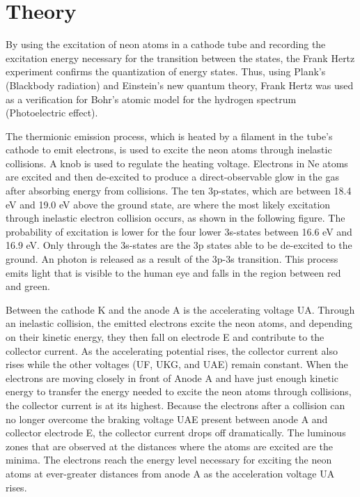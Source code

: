 \section{Theory}

	By using the excitation of neon atoms in a cathode tube and recording the excitation energy necessary for the transition between the states, the Frank Hertz experiment confirms the quantization of energy states. Thus, using Plank's (Blackbody radiation) and Einstein's new quantum theory, Frank Hertz was used as a verification for Bohr's atomic model for the hydrogen spectrum (Photoelectric effect).

	The thermionic emission process, which is heated by a filament in the tube's cathode to emit electrons, is used to excite the neon atoms through inelastic collisions. A knob is used to regulate the heating voltage. Electrons in Ne atoms are excited and then de-excited to produce a direct-observable glow in the gas after absorbing energy from collisions. The ten 3p-states, which are between 18.4 eV and 19.0 eV above the ground state, are where the most likely excitation through inelastic electron collision occurs, as shown in the following figure. The probability of excitation is lower for the four lower 3s-states between 16.6 eV and 16.9 eV. Only through the 3s-states are the 3p states able to be de-excited to the ground. An photon is released as a result of the 3p-3s transition. This process emits light that is visible to the human eye and falls in the region between red and green.

	Between the cathode K and the anode A is the accelerating voltage UA. Through an inelastic collision, the emitted electrons excite the neon atoms, and depending on their kinetic energy, they then fall on electrode E and contribute to the collector current. As the accelerating potential rises, the collector current also rises while the other voltages (UF, UKG, and UAE) remain constant. When the electrons are moving closely in front of Anode A and have just enough kinetic energy to transfer the energy needed to excite the neon atoms through collisions, the collector current is at its highest. Because the electrons after a collision can no longer overcome the braking voltage UAE present between anode A and collector electrode E, the collector current drops off dramatically. The luminous zones that are observed at the distances where the atoms are excited are the minima. The electrons reach the energy level necessary for exciting the neon atoms at ever-greater distances from anode A as the acceleration voltage UA rises.
	
